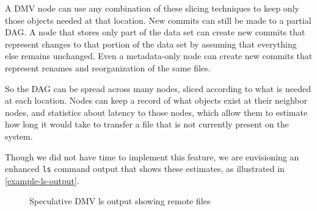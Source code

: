 A DMV node can use any combination of these slicing techniques to keep only
those objects needed at that location. New commits can still be made to a
partial DAG. A node that stores only part of the data set can create new commits
that represent changes to that portion of the data set by assuming that
everything else remains unchanged. Even a metadata-only node can create new
commits that represent renames and reorganization of the same files.

So the DAG can be spread across many nodes, sliced according to what is needed
at each location. Nodes can keep a record of what objects exist at their
neighbor nodes, and statistics about latency to those nodes, which allow them to
estimate how long it would take to transfer a file that is not currently present
on the system.

Though we did not have time to implement this feature, we are envisioning an
enhanced \lstinline{ls} command output that shows these estimates, as
illustrated in \autoref{example-ls-output}.

\begin{figure}[]
    \caption{Speculative DMV ls output showing remote files}
    \label{example-ls-output}
    
\end{figure}


%
